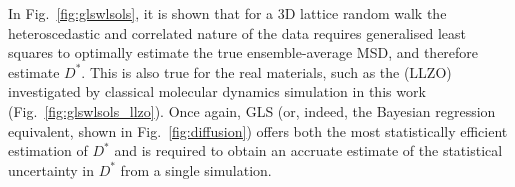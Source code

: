 \documentclass[reprint,superscriptaddress,nobibnotes,amsmath,amssymb,aps,prx,hidelinks,linenumbers]{revtex4-2}
\newcommand{\prob}[1]{\ensuremath{p(#1)}}
\newcommand{\Dest}{\ensuremath{\widehat{D}^*}}
\newcommand{\D}{\ensuremath{D^*}}
\begin{document}
In Fig.~\ref{fig:glswlsols}, it is shown that for a 3D lattice random walk the heteroscedastic and correlated nature of the data requires generalised least squares to optimally estimate the true ensemble-average MSD, and therefore estimate $\D$. 
This is also true for the real materials, such as the  (LLZO) investigated by classical molecular dynamics simulation in this work (Fig.~\ref{fig:glswlsols_llzo}).
Once again, GLS (or, indeed, the Bayesian regression equivalent, shown in Fig.~\ref{fig:diffusion}) offers both the most statistically efficient estimation of $\D$ and is required to obtain an accruate estimate of the statistical uncertainty in $\D$ from a single simulation. 
\end{document}
